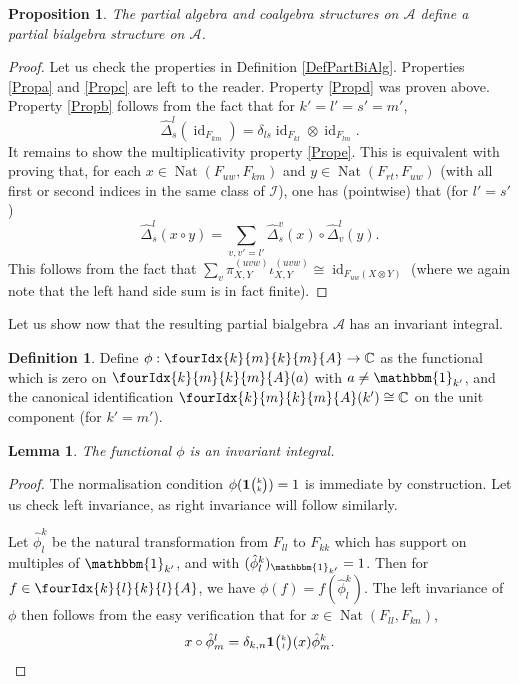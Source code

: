 \documentclass[11pt]{article}
\DeclareMathOperator{\id}{id}
\DeclareMathOperator{\Nat}{\mathrm{Nat}}
\newcommand{\C}{\mathbb{C}}
\newcommand{\Grt}[3]{#1{\tiny {\begin{pmatrix} #2\\#3\end{pmatrix}}}}
\newcommand{\Unitb}{\mathbbm{1}}
\newcommand{\UnitC}[2]{\Grt{\mathbf{1}}{#1}{#2}}
\newcommand{\Gr}[5]{\fourIdx{#2}{#4}{#3}{#5}{#1}}%
\newtheorem{Lem}[Theorem]{Lemma}
\newtheorem{Prop}[Theorem]{Proposition}
\theoremstyle{definition}
\newtheorem{Def}[Theorem]{Definition}
\numberwithin{equation}{section}
\begin{document}
\begin{Prop} The partial algebra and coalgebra structures on $\mathscr{A}$ define a partial bialgebra structure on $\mathscr{A}$. 
\end{Prop}
\begin{proof} Let us check the properties in Definition \ref{DefPartBiAlg}. Properties \ref{Propa} and \ref{Propc} are left to the reader. Property \ref{Propd} was proven above. Property \ref{Propb} follows from the fact that for $k'=l'=s'=m'$, \[\hat{\Delta}^{l}_s(\id_{F_{km}}) = \delta_{ls} \id_{F_{kl}}\otimes \id_{F_{lm}}.\] 
It remains to show the multiplicativity property \ref{Prope}. This is equivalent with proving that, for each $x\in \Nat(F_{uw},F_{km})$ and $y\in \Nat(F_{rt},F_{uw})$ (with all first or second indices in the same class of $\mathscr{I}$), one has (pointwise) that (for $l'=s'$) \[ \hat{\Delta}^l_s(x\circ y) = \sum_{v,v'=l'} \hat{\Delta}^v_s(x)\circ \hat{\Delta}^l_v(y).\] This follows from the fact that $\sum_v \pi^{(uvw)}_{X,Y}\iota^{(uvw)}_{X,Y} \cong \id_{F_{uw}(X\otimes Y)}$ (where we again note that the left hand side sum is in fact finite).
\end{proof} 

Let us show now that the resulting partial bialgebra $\mathscr{A}$ has an invariant integral.

\begin{Def} Define $\phi: \Gr{A}{k}{k}{m}{m} \rightarrow \C$ as the functional which is zero on $\Gr{A}{k}{k}{m}{m}(a)$ with $a\neq \Unitb_{k'}$, and the canonical identification $\Gr{A}{k}{k}{m}{m}(k')\cong \C$ on the unit component (for $k'=m'$).
\end{Def}

\begin{Lem} The functional $\phi$ is an invariant integral.
\end{Lem}

\begin{proof} The normalisation condition $\phi(\UnitC{k}{k})=1$ is immediate by construction. Let us check left invariance, as right invariance will follow similarly.

Let $\hat{\phi}^k_l$ be the natural transformation from $F_{ll}$ to $F_{kk}$ which has support on multiples of $\Unitb_{k'}$, and with $(\hat{\phi}^k_l)_{\Unitb_{k'}} = 1$.  Then for $f\in \Gr{A}{k}{k}{l}{l}$, we have $\phi(f) = f(\hat{\phi}^k_l)$. The left invariance of $\phi$ then follows from the easy verification that for $x\in \Nat(F_{ll},F_{kn})$, \[x\circ \hat{\phi}^l_m =\delta_{k,n} \UnitC{k}{l}(x)\hat{\phi}^k_m.\] 
\end{proof}
\end{document}
